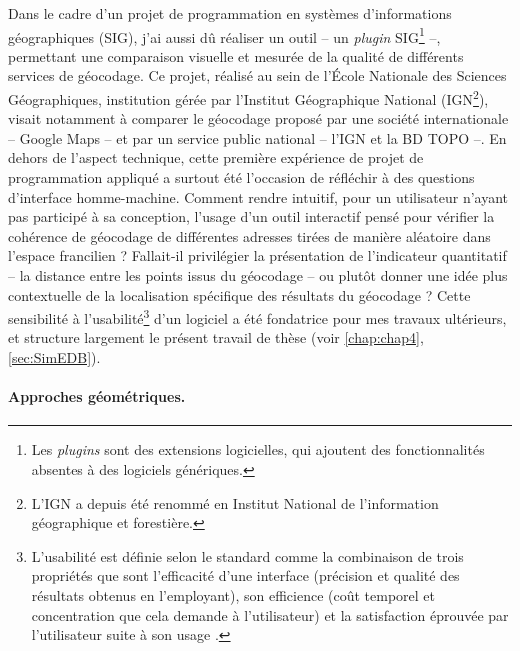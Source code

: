 Dans le cadre d'un projet de programmation en systèmes d'informations géographiques (SIG), j'ai aussi dû réaliser un outil -- un \textit{plugin} SIG\footnote{
	Les \textit{plugins} sont des extensions logicielles, qui ajoutent des fonctionnalités absentes à des logiciels génériques.
} --, permettant une comparaison visuelle et mesurée de la qualité de différents services de géocodage.
Ce projet, réalisé au sein de l'École Nationale des Sciences Géographiques, institution gérée par l'Institut Géographique National (IGN\footnote{
	L'IGN a depuis été renommé en \og Institut National de l'information géographique et forestière\fg{}.
}), visait notamment à comparer le géocodage proposé par une société internationale -- Google Maps -- et par un service public national -- l'IGN et la BD TOPO --.
En dehors de l'aspect technique, cette première expérience de projet de programmation appliqué a surtout été l'occasion de réfléchir à des questions d'interface homme-machine.
Comment rendre intuitif, pour un utilisateur n'ayant pas participé à sa conception, l'usage d'un outil interactif pensé pour vérifier la cohérence de géocodage de différentes adresses tirées de manière aléatoire dans l'espace francilien ?
Fallait-il privilégier la présentation de l'indicateur quantitatif -- la distance entre les points issus du géocodage -- ou plutôt donner une idée plus contextuelle de la localisation spécifique des résultats du géocodage ?
Cette sensibilité à l'\og usabilité\fg{}\footnote{
	L'usabilité est définie selon le standard \textcite{iso20189241} comme la combinaison de trois propriétés que sont \og l'efficacité\fg{} d'une interface (précision et qualité des résultats obtenus en l'employant), son \og efficience\fg{} (coût temporel et concentration que cela demande à l'utilisateur) et la satisfaction éprouvée par l'utilisateur suite à son usage \autocite[39]{zheng_interactive_2019}.
} d'un logiciel a été fondatrice pour mes travaux ultérieurs, et structure largement le présent travail de thèse (voir \cref{chap:chap4}, \cref{sec:SimEDB}).

\paragraph{Approches géométriques.}

